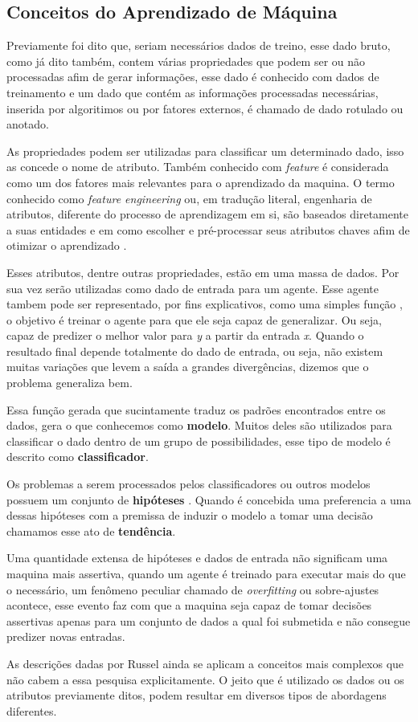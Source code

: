\subsection{Conceitos do Aprendizado de Máquina}
Previamente foi dito que, seriam necessários dados de treino, esse dado bruto, como já dito também, contem várias propriedades que podem ser ou não processadas afim de gerar informações, esse dado é conhecido com dados de treinamento e um dado que contém as informações processadas necessárias, inserida por algoritimos ou por fatores externos, é chamado de dado rotulado ou anotado.

As propriedades podem ser utilizadas para classificar um determinado dado, isso as concede o nome de atributo. Também conhecido com \textit{feature} é considerada como um dos fatores mais relevantes para o aprendizado da maquina. O termo conhecido como \textit{feature engineering} ou, em tradução literal, engenharia de atributos, diferente do processo de aprendizagem em si, são baseados diretamente a suas entidades e em como escolher e pré-processar seus atributos chaves afim de otimizar o aprendizado \cite{domingos2012few}.

Esses atributos, dentre outras propriedades, estão em uma massa de dados. Por sua vez serão utilizadas como dado de entrada para um agente. Esse agente tambem pode ser representado, por fins explicativos, como uma simples função , o objetivo é treinar o agente para que ele seja capaz de generalizar. Ou seja, capaz de predizer o melhor valor para \textit{y} a partir da entrada \textit{x}. Quando o resultado final depende totalmente do dado de entrada, ou seja, não existem muitas variações que levem a saída a grandes divergências, dizemos que o problema generaliza bem.

Essa função gerada que sucintamente traduz os padrões encontrados entre os dados, gera o que conhecemos como \textbf{modelo}. Muitos deles são utilizados para classificar o dado dentro de um grupo de possibilidades, esse tipo de modelo é descrito como \textbf{classificador}.

Os problemas a serem processados pelos classificadores ou outros modelos possuem um conjunto de \textbf{ hipóteses }. Quando é concebida uma preferencia a uma dessas hipóteses com a premissa de induzir o modelo a tomar uma decisão chamamos esse ato de \textbf{tendência}.

Uma quantidade extensa de hipóteses e dados de entrada não significam uma maquina mais assertiva, quando um agente é treinado para executar mais do que o necessário, um fenômeno peculiar chamado de \textit{overfitting} ou sobre-ajustes acontece, esse evento faz com que a maquina seja capaz de tomar decisões assertivas apenas para um conjunto de dados a qual foi submetida e não consegue predizer novas entradas.

As descrições dadas por Russel \cite[693]{russell2003artificial} ainda se aplicam a conceitos mais complexos que não cabem a essa pesquisa explicitamente. O jeito que é utilizado os dados ou os atributos previamente ditos, podem resultar em diversos tipos de abordagens diferentes.
